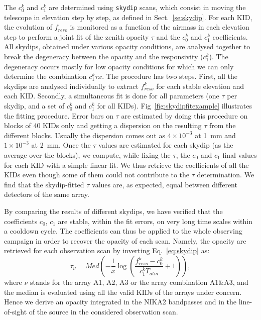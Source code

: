 The $c_0^k$ and $c_1^k$ are determined using {\tt skydip} scans, which
consist in moving the telescope in elevation step by step, as
defined in Sect.~\ref{se:skydip}. For each KID, the evolution
of $f_{reso}$ is monitored as a function of the airmass in each
elevation step to perform a joint fit of the zenith opacity $\tau$ and
the $c_0^k$ and $c_1^k$ coefficients.
All skydips, obtained under various opacity conditions, are analysed
together to break the degeneracy between the opacity and the
responsivity ($c_1^k$). The degeneracy occurs mostly for low opacity
conditions for which we can only determine the combination
$c_1^k \tau x$. The procedure has two steps. First, all the skydips
are analysed individually to extract $f_{reso}^k$ for each
stable elevation and each KID. Secondly, a simultaneous fit is done
for all parameters (one $\tau$ per skydip, and a set of $c_0^k$ and
$c_1^k$ for all KIDs). Fig~\ref{fig:skydipfitexample} illustrates the
fitting procedure.  Error bars on $\tau$ are estimated by doing this
procedure
on blocks of 40 KIDs only and getting a dispersion on the resulting
$\tau$ from the different blocks. Usually the dispersion comes out as
$4\times 10^{-3}$ at 1~mm and $1\times 10^{-3}$ at 2~mm. Once the
$\tau$ values are estimated for each skydip (as the average over the
blocks), we compute, while fixing the $\tau$, the $c_0$ and $c_1$
final values for each KID with a simple linear fit. We thus retrieve
the coefficients of all the KIDs even though some of them could not
contribute to the $\tau$ determination. We find that the skydip-fitted
$\tau$ values are, as expected, equal between different detectors of
the same array.

By comparing the results of different skydips, we have verified that the
coefficients $c_0$, $c_1$ are stable, within the fit errors, on very
long time scales within a cooldown cycle. The coefficients can thus be
applied to the whole observing campaign in order to recover the
opacity of each scan. Namely, the opacity %
are retrieved for each observation scan by
inverting Eq.~\ref{eq:skydip} as:
\begin{equation}
\tau_\nu =   Med\left( -\frac{1}{x} \log\left( \frac{f_{reso}^k - c_0^k}{c_1^kT_{atm}} +1 \right)\right), 
\end{equation}
where $\nu$ stands for the array A1, A2, A3 or the array
combination A1$\&$A3, and the median is evaluated using all the valid
KIDs of the arrays under concern. Hence we derive an opacity integrated in the NIKA2 bandpasses and
in the line-of-sight of the source in the considered observation scan.


